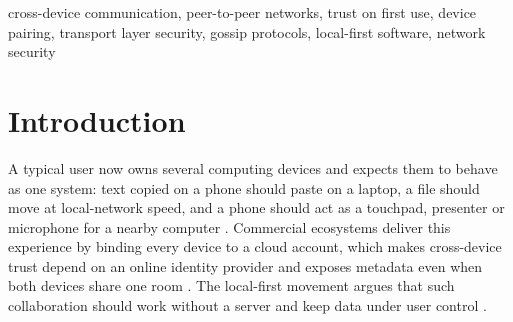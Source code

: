 \documentclass[conference,a4paper]{IEEEtran}
\begin{document}
\begin{abstract}
Personal computing now spans laptops, phones and televisions, yet the tools that connect these devices either depend on a vendor cloud account or require every pair of devices to be introduced separately. This paper presents Link, a zero-cloud framework that joins Windows and Android devices on a local network into a mutually authenticated device mesh. Link contributes a transitive trust-on-first-use enrollment protocol in which one human-verified pairing with any member admits a newcomer to the whole pool, a membership digest carried by heartbeats for anti-entropy repair, and flooded revocation. Traffic is separated into a persistent TLS control plane, an ephemeral certificate-pinned bulk plane with write back-pressure, and a UDP real-time plane for input events and AES-GCM protected Opus audio. The unmodified protocol implementation was evaluated under controlled network emulation. A sixteen-device pool converged after an enrollment in \EnrMeshSixteen~ms and purged a revoked device in \RevMeshSixteen~ms, while the number of human pairing ceremonies fell from quadratic to linear in the pool size. Computing the digest over the full membership view removed up to \AEMiBSixteen~MiB of redundant synchronization traffic per heartbeat. The bulk plane matched raw TCP goodput on a shaped 300~Mbps link with \CpuRatioWifi\ times lower CPU cost than Base64 transfer over the control channel, and the UDP plane bounded the 99th-percentile input latency at \InpUdpOnePnn~ms under one percent loss, against \InpMuxOnePnn~ms for a single multiplexed stream.
\end{abstract}

\begin{IEEEkeywords}
cross-device communication, peer-to-peer networks, trust on first use, device pairing, transport layer security, gossip protocols, local-first software, network security
\end{IEEEkeywords}

\section{Introduction}
A typical user now owns several computing devices and expects them to behave as one system: text copied on a phone should paste on a laptop, a file should move at local-network speed, and a phone should act as a touchpad, presenter or microphone for a nearby computer \cite{brudy2019crossdevice}. Commercial ecosystems deliver this experience by binding every device to a cloud account, which makes cross-device trust depend on an online identity provider and exposes metadata even when both devices share one room \cite{celosia2020discontinued, stute2019billion}. The local-first movement argues that such collaboration should work without a server and keep data under user control \cite{kleppmann2019localfirst}.
\end{document}
